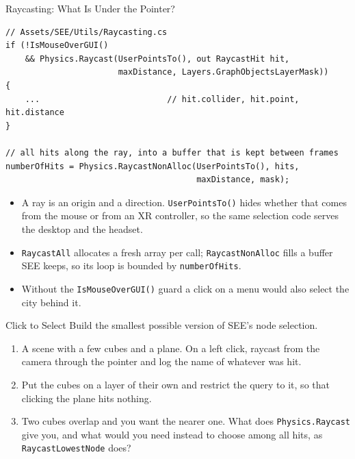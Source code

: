 \begin{frame}[fragile]{Raycasting: What Is Under the Pointer?}
  \begin{lstlisting}[basicstyle=\scriptsize\ttfamily]
// Assets/SEE/Utils/Raycasting.cs
if (!IsMouseOverGUI()
    && Physics.Raycast(UserPointsTo(), out RaycastHit hit,
                       maxDistance, Layers.GraphObjectsLayerMask))
{
    ...                          // hit.collider, hit.point, hit.distance
}

// all hits along the ray, into a buffer that is kept between frames
numberOfHits = Physics.RaycastNonAlloc(UserPointsTo(), hits,
                                       maxDistance, mask);
  \end{lstlisting}
  \vspace{1ex}

  \begin{itemize}
    \item A ray is an origin and a direction. \texttt{UserPointsTo()} hides
      whether that comes from the mouse or from an XR controller, so the same
      selection code serves the desktop and the headset.
    \item \texttt{RaycastAll} allocates a fresh array per call;
      \texttt{RaycastNonAlloc} fills a buffer SEE keeps, so its loop is bounded
      by \texttt{numberOfHits}.
    \item Without the \texttt{IsMouseOverGUI()} guard a click on a menu would
      also select the city behind it.
  \end{itemize}
\end{frame}

\begin{exerciseframe}{Click to Select}
  Build the smallest possible version of SEE's node selection.
  \vspace{1ex}

  \begin{enumerate}
    \item A scene with a few cubes and a plane. On a left click, raycast from
      the camera through the pointer and log the name of whatever was hit.
    \item Put the cubes on a layer of their own and restrict the query to it,
      so that clicking the plane hits nothing.
    \item Two cubes overlap and you want the nearer one. What does
      \texttt{Physics.Raycast} give you, and what would you need instead to
      choose among all hits, as \texttt{RaycastLowestNode} does?
  \end{enumerate}
\end{exerciseframe}

